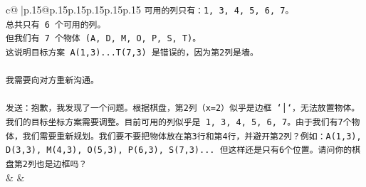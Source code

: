 \documentclass{article}
\begin{document}
{\begin{supertabular}{c@{$\;$}|p{.15\linewidth}@{}p{.15\linewidth}p{.15\linewidth}p{.15\linewidth}p{.15\linewidth}p{.15\linewidth}}
{{{\texttt{可用的列只有：1, 3, 4, 5, 6, 7。} \\
\texttt{总共只有 6 个可用的列。} \\
\texttt{但我们有 7 个物体 (A, D, M, O, P, S, T)。} \\
\texttt{这说明目标方案 A(1,3)...T(7,3) 是错误的，因为第2列是墙。} \\
\\ 
\texttt{我需要向对方重新沟通。} \\
\\ 
\texttt{发送：抱歉，我发现了一个问题。根据棋盘，第2列（x=2）似乎是边框 `│`，无法放置物体。我们的目标坐标方案需要调整。目前可用的列似乎是 1, 3, 4, 5, 6, 7。由于我们有7个物体，我们需要重新规划。我们要不要把物体放在第3行和第4行，并避开第2列？例如：A(1,3), D(3,3), M(4,3), O(5,3), P(6,3), S(7,3)... 但这样还是只有6个位置。请问你的棋盘第2列也是边框吗？} \\
            }
        }
    }
    & & \\ \\


\end{supertabular}}
\end{document}

